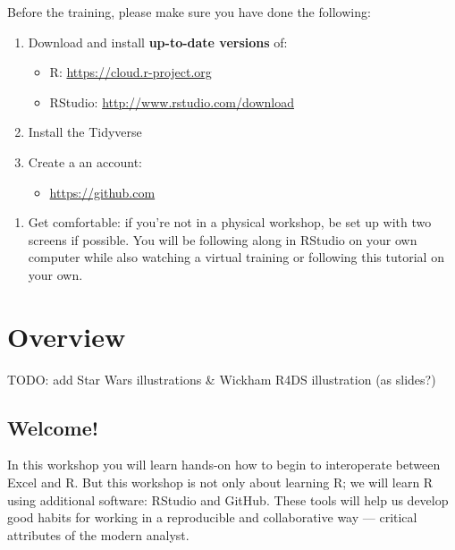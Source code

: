 \documentclass[]{book}
\providecommand{\tightlist}{%
  \setlength{\itemsep}{0pt}\setlength{\parskip}{0pt}}
\begin{document}
Before the training, please make sure you have done the following:

\begin{enumerate}
\def\labelenumi{\arabic{enumi}.}
\tightlist
\item
  Download and install \textbf{up-to-date versions} of:

  \begin{itemize}
  \tightlist
  \item
    R: \url{https://cloud.r-project.org}
  \item
    RStudio: \url{http://www.rstudio.com/download}
  \end{itemize}
\item
  Install the Tidyverse
\item
  Create a an account:

  \begin{itemize}
  \tightlist
  \item
    \url{https://github.com}
  \end{itemize}
\end{enumerate}

\begin{enumerate}
\def\labelenumi{\arabic{enumi}.}
\tightlist
\item
  Get comfortable: if you're not in a physical workshop, be set up with two screens if possible. You will be following along in RStudio on your own computer while also watching a virtual training or following this tutorial on your own.
\end{enumerate}

\hypertarget{overview}{%
\chapter{Overview}\label{overview}}

TODO: add Star Wars illustrations \& Wickham R4DS illustration (as slides?)

\hypertarget{welcome-1}{%
\section{Welcome!}\label{welcome-1}}

In this workshop you will learn hands-on how to begin to interoperate between Excel and R. But this workshop is not only about learning R; we will learn R using additional software: RStudio and GitHub. These tools will help us develop good habits for working in a reproducible and collaborative way --- critical attributes of the modern analyst.
\end{document}
